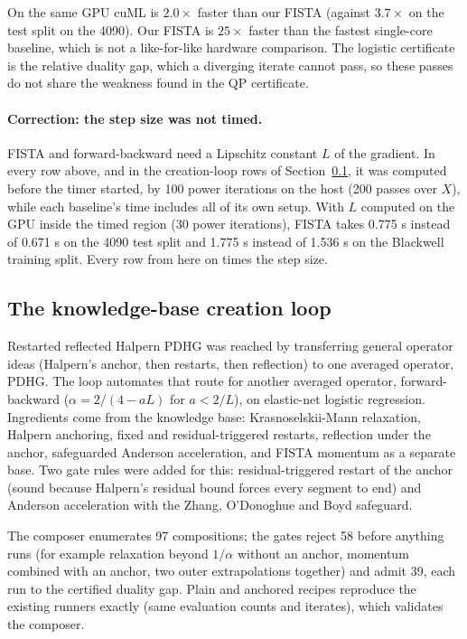 On the same GPU cuML is $2.0\times$ faster than our FISTA (against $3.7\times$ on
the test split on the 4090). Our FISTA is $25\times$ faster than the fastest
single-core baseline, which is not a like-for-like hardware comparison. The
logistic certificate is the relative duality gap, which a diverging iterate
cannot pass, so these passes do not share the weakness found in the QP
certificate.

\paragraph{Correction: the step size was not timed.}
FISTA and forward-backward need a Lipschitz constant $L$ of the gradient. In
every row above, and in the creation-loop rows of
Section~\ref{app:log:kbloop}, it was computed before the timer started, by 100
power iterations on the host (200 passes over $X$), while each baseline's time
includes all of its own setup. With $L$ computed on the GPU inside the timed
region (30 power iterations), FISTA takes 0.775 s instead of 0.671 s on the
4090 test split and 1.775 s instead of 1.536 s on the Blackwell training split.
Every row from here on times the step size.

\subsection{The knowledge-base creation loop}
\label{app:log:kbloop}

 Restarted reflected Halpern PDHG was reached
by transferring general operator ideas (Halpern's anchor, then restarts, then
reflection) to one averaged operator, PDHG. The loop automates that route for
another averaged operator, forward-backward ($\alpha = 2/(4-aL)$ for $a<2/L$),
on elastic-net logistic regression. Ingredients come from the knowledge base:
Krasnoselskii-Mann relaxation, Halpern anchoring, fixed and residual-triggered
restarts, reflection under the anchor, safeguarded Anderson acceleration, and
FISTA momentum as a separate base. Two gate rules were added for this:
residual-triggered restart of the anchor (sound because Halpern's residual
bound forces every segment to end) and Anderson acceleration with the
Zhang, O'Donoghue and Boyd safeguard.

The composer enumerates 97 compositions; the gates reject 58 before anything
runs (for example relaxation beyond $1/\alpha$ without an anchor, momentum
combined with an anchor, two outer extrapolations together) and admit 39,
each run to the certified duality gap. Plain and anchored recipes reproduce
the existing runners exactly (same evaluation counts and iterates), which
validates the composer.

